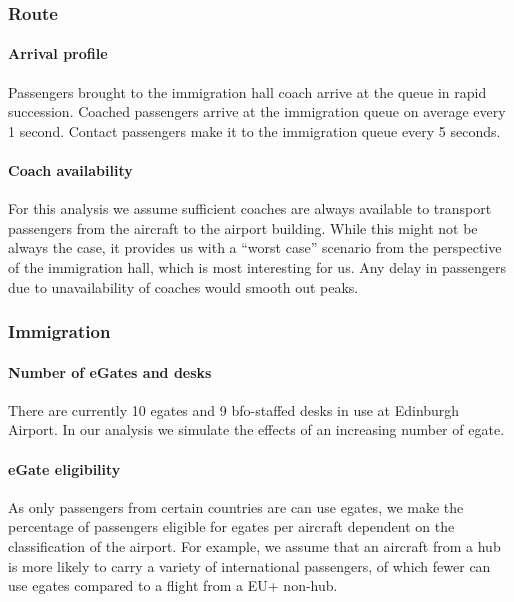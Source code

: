 \documentclass[10pt]{article}
\begin{document}
\subsubsection{Route}

\paragraph{Arrival profile} 
 Passengers  brought to the immigration hall coach arrive at the queue in rapid succession. Coached passengers arrive at the immigration queue on average every 1 second. Contact passengers make it to the immigration queue every 5 seconds.

\paragraph{Coach availability}
For this analysis we assume sufficient coaches are always available to transport passengers from the aircraft to the airport building. While this might not be always the case, it provides us with a ``worst case'' scenario from the perspective of the immigration hall, which is most interesting for us. Any delay in passengers due to unavailability of coaches would smooth out peaks.

\subsubsection{Immigration} \label{subsec:choices_immigration}

\paragraph{Number of eGates and desks} There are currently 10 \glspl{egate} and 9 \gls{bfo}-staffed desks in use at Edinburgh Airport. In our analysis we simulate the effects of an increasing number of \gls{egate}.



\paragraph{eGate eligibility} 
As only passengers from certain countries are can use \glspl{egate}, we make the percentage of passengers eligible for \glspl{egate} per aircraft dependent on the classification of the airport. For example, we assume that an aircraft from a hub is more likely to carry a variety of international passengers, of which fewer can use \glspl{egate} compared to a flight from a EU+ non-hub. 
\end{document}
